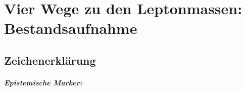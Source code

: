 
\providecommand{\BM}{\textbf{[B]}}
\providecommand{\KM}{\textbf{[K]}}
\providecommand{\SM}{\textbf{[S]}}
\providecommand{\EM}{\textbf{[E]}}

\chapter*{Vier Wege zu den Leptonmassen: Bestandsaufnahme}

\begin{abstract}
Der FFGFT-Korpus enthält inzwischen vier voneinander unabhängige Zugänge zu den
Massen der geladenen Leptonen: die T0-Leiter aus Torus-Wicklungszahlen (Dok.~006,
338, 352), die Koide-Formel mit $\theta = 2/9$ aus einem einzigen $A_5$-Matrixelement
(Dok.~292, 367), die Galois-Identitäten aus GF$(3^n)$-Ordnungen (Dok.~338) und das
$\phi$-Skelett der ikosaedrischen Umverteilungsgewichte (Dok.~368). Dieses
Dokument stellt die vier Wege nebeneinander: Eingang, Ausgang, Genauigkeit gegen PDG,
epistemischer Status. Befund: die Wege liefern verschiedene \emph{Arten} von
Aussagen (absolute Massen, Verhältnisse, Constraints) mit Genauigkeiten von
$1{,}6\,\%$ bis $10^{-3}\,\%$. Die Koide-Route ist die einzige parameterfreie und die
präziseste; die T0-Leiter die einzige mit absoluten Massen. Ein fünfter Weg -- die Koide-Skala $M$ aus der T0-Leiter -- ist Weg~1
summiert ($0{,}31\,\%$) und zeigt, dass $M$ keine unabhängige Skala ist.
Die offene Kante ist in allen Wegen dieselbe: die fraktal-rekursive Korrektur von Prozent- auf
$10^{-3}$-Niveau ist gemessen, nicht hergeleitet.
\end{abstract}

\section*{Zeichenerklärung}

\paragraph*{Epistemische Marker:}\mbox{}\\[2pt]



